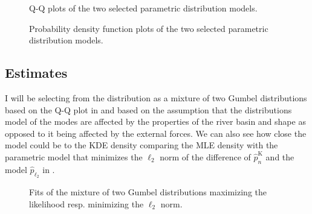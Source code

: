 \begin{figure}[H]
    \centering
    \caption{Q-Q plots of the two selected parametric distribution models.}
    \label{fig:QQ_selection_mixture}
\end{figure}

\begin{figure}[H]
    \centering
    \caption{Probability density function plots of the two selected parametric distribution models.}
    \label{fig:PD_selection_mixture}
\end{figure}


\subsection{Estimates}%
\label{sub:estimates}

I will be selecting from the distribution as a mixture of two Gumbel distributions based on the Q-Q plot in 
 and based on the assumption that the distributions model of the modes are affected by
the properties of the river basin and shape as opposed to it being affected by the external forces. We can also see
how close the model could be to the \ac{KDE} density comparing the \ac{MLE} density with the parametric model that
minimizes the \(\ell_2\) norm of the difference of \(\hat{p}_n^{\text{K}}\) and the model \(\hat{p}_{\ell_2}\) in
.


\begin{figure}[h]
    \centering
    \caption{Fits of the mixture of two Gumbel distributions maximizing the likelihood resp. minimizing the  \(\ell_2\) norm.}
    \label{fig:gumbel_mixture_fits}
\end{figure}


